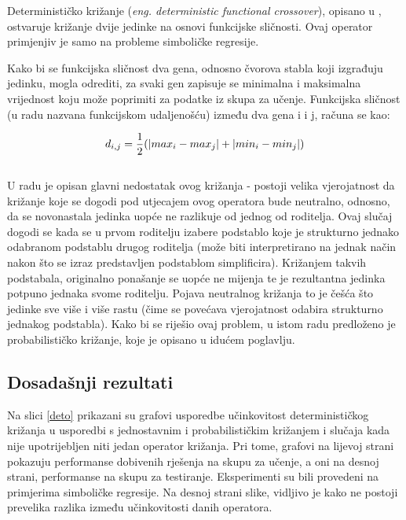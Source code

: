 Determinističko križanje (\textit{eng. deterministic functional crossover}), opisano u \cite{crxDeter}, ostvaruje križanje dvije jedinke na osnovi funkcijske sličnosti. Ovaj operator primjenjiv je samo na probleme simboličke regresije.

Kako bi se funkcijska sličnost dva gena, odnosno čvorova stabla koji izgrađuju jedinku, mogla odrediti, za svaki gen zapisuje se minimalna i maksimalna vrijednost koju može poprimiti za podatke iz skupa za učenje. Funkcijska sličnost (u radu nazvana funkcijskom udaljenošću) između dva gena i i j, računa se kao:

\begin{equation} 
\label{udaljenost}
 \large{ d_{i,j} = \frac{1}{2} (|max_i - max_j| + |min_i - min_j|) }
\end{equation}
\\
U radu je opisan glavni nedostatak ovog križanja - postoji velika vjerojatnost da križanje koje se dogodi pod utjecajem ovog operatora bude neutralno, odnosno, da se novonastala jedinka uopće ne razlikuje od jednog od roditelja. Ovaj slučaj dogodi se kada se u prvom roditelju izabere podstablo koje je strukturno jednako odabranom podstablu drugog roditelja (može biti interpretirano na jednak način nakon što se izraz predstavljen podstablom simplificira). Križanjem takvih podstabala, originalno ponašanje se uopće ne mijenja te je rezultantna jedinka potpuno jednaka svome roditelju. Pojava neutralnog križanja to je češća što jedinke sve više i više rastu (čime se povećava vjerojatnost odabira strukturno jednakog podstabla). Kako bi se riješio ovaj problem, u istom radu predloženo je probabilističko križanje, koje je opisano u idućem poglavlju.

\subsection{Dosadašnji rezultati}
Na slici \ref{deto} prikazani su grafovi usporedbe učinkovitost determinističkog križanja u usporedbi s jednostavnim i probabilističkim križanjem i slučaja kada nije upotrijebljen niti jedan operator križanja. Pri tome, grafovi na lijevoj strani pokazuju performanse dobivenih rješenja na skupu za učenje, a oni na desnoj strani, performanse na skupu za testiranje. Eksperimenti su bili provedeni na primjerima simboličke regresije. Na desnoj strani slike, vidljivo je kako ne postoji prevelika razlika između učinkovitosti danih operatora. 


